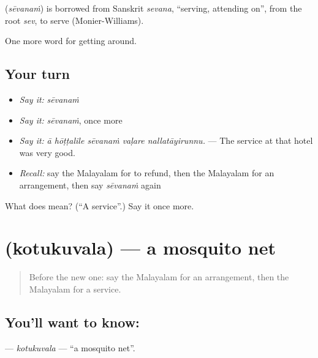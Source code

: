 \begin{cousinweb}
\textbf{} (\emph{sēvanaṁ}) is borrowed from Sanskrit \emph{sevana}, \textquotedblleft{}serving, attending on\textquotedblright{}, from the root \emph{sev}, to serve (Monier-Williams).
\end{cousinweb}

\begin{grammarlens}[title={What you've built}]
One more word for getting around.
\end{grammarlens}

\subsection*{Your turn}
\begin{itemize}
\raggedright
  \item \emph{Say it:} \emph{sēvanaṁ}
  \item \emph{Say it:} \emph{sēvanaṁ}, once more
  \item \emph{Say it:} \emph{ā hōṭṭalile sēvanaṁ vaḷare nallatāyirunnu.} — The service at that hotel was very good.
  \item \emph{Recall:} say the Malayalam for to refund, then the Malayalam for an arrangement, then say \emph{sēvanaṁ} again
\end{itemize}

\begin{tcolorbox}[breakable,colback=teal!4,colframe=teal!35!black,title={Before you move on}]
What does  mean? (\textquotedblleft{}A service\textquotedblright{}.) Say it once more.
\end{tcolorbox}
\section[\texorpdfstring{\ml{കൊതുകുവല} (kotukuvala)}{കൊതുകുവല (kotukuvala)}]{ (kotukuvala) — a mosquito net}

\label{lesson:ML-C483-kotukuvala}



\begin{quote}
Before the new one: say the Malayalam for an arrangement, then the Malayalam for a service.
\end{quote}

\subsection*{You'll want to know: }
\textbf{} — \emph{kotukuvala} — \textquotedblleft{}a mosquito net\textquotedblright{}.

